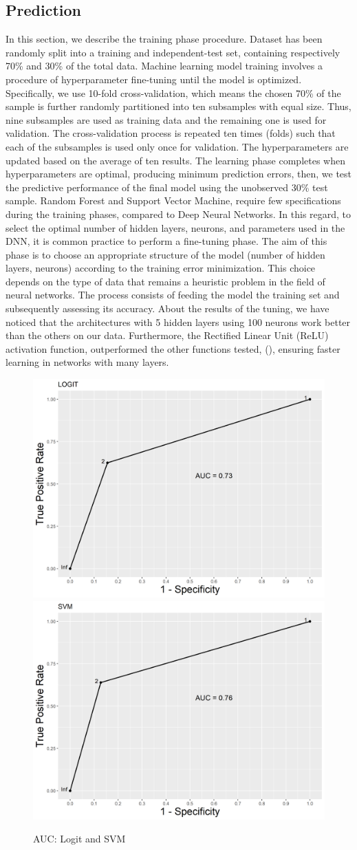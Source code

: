 \documentclass[a4,12pt]{article}
\begin{document}
\subsection{Prediction}
In this section, we describe the training phase procedure.
Dataset has been randomly split into a training and independent-test set, containing respectively 70\% and 30\% of the total data. Machine learning model training involves a procedure of hyperparameter fine-tuning until the model is optimized. Specifically, we use 10-fold cross-validation, which means the chosen 70\% of the sample is further randomly partitioned into ten subsamples with equal size. Thus, nine subsamples are used as training data and the remaining one is used for validation. The cross-validation process is repeated ten times (folds) such that each of the subsamples is used only once for validation. The hyperparameters are updated based on the average of ten results. The learning phase completes when hyperparameters are optimal, producing minimum prediction errors, then, we test the predictive performance of the final model using the unobserved 30\% test sample. 
Random Forest and Support Vector Machine, require few specifications during the training phases, compared to Deep Neural Networks. In this regard, to select the optimal number of hidden layers, neurons, and parameters used in the DNN, it is common practice to perform a fine-tuning phase. The aim of this phase is to choose an appropriate structure of the model (number of hidden layers, neurons) according to the training error minimization. This choice depends on the type of data that remains a heuristic problem in the field of neural networks. The process consists of feeding the model the training set and subsequently assessing its accuracy.
About the results of the tuning, we have noticed that the architectures with 5 hidden layers using 100 neurons work better than the others on our data. Furthermore, the Rectified Linear Unit (ReLU) activation function, outperformed the other functions tested, (\cite{Glorot}), ensuring faster learning in networks with many layers.


\begin{figure}[H]
		\centering
		\includegraphics[width=0.45\linewidth]{logit}\quad
		\includegraphics[width=0.45\linewidth]{svm}
		\caption{AUC: Logit and SVM}
		\label{fig:AUC1}
\end{figure}
\end{document}

